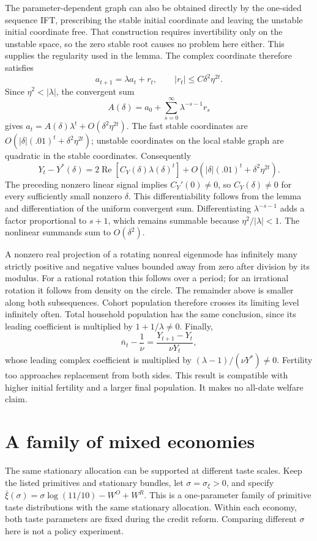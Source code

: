 \documentclass[
  11pt,
]{article}
\begin{document}
The parameter-dependent graph can also be obtained directly by the
one-sided sequence IFT, prescribing the stable initial coordinate and
leaving the unstable initial coordinate free. That construction requires
invertibility only on the unstable space, so the zero stable root causes
no problem here either. This supplies the regularity used in the lemma.
The complex coordinate therefore satisfies \[
 a_{t+1}=\lambda a_t+r_t,\qquad
 |r_t|\le C\delta^2\eta^{2t}.
\] Since \(\eta^2<|\lambda|\), the convergent sum \[
 A(\delta)=a_0+\sum_{s=0}^\infty\lambda^{-s-1}r_s
\] gives \(a_t=A(\delta)\lambda^t+O(\delta^2\eta^{2t})\). The fast
stable coordinates are \(O(|\delta|(.01)^t+\delta^2\eta^{2t})\);
unstable coordinates on the local stable graph are quadratic in the
stable coordinates. Consequently \[
 Y_t-Y^*(\delta)=2\operatorname{Re}
       [C_Y(\delta)\lambda(\delta)^t]
       +O(|\delta|(.01)^t+\delta^2\eta^{2t}).
\] The preceding nonzero linear signal implies \(C_Y'(0)\ne0\), so
\(C_Y(\delta)\ne0\) for every sufficiently small nonzero \(\delta\).
This differentiability follows from the lemma and differentiation of the
uniform convergent sum. Differentiating \(\lambda^{-s-1}\) adds a factor
proportional to \(s+1\), which remains summable because
\(\eta^2/|\lambda|<1\). The nonlinear summands sum to \(O(\delta^2)\).

A nonzero real projection of a rotating nonreal eigenmode has infinitely
many strictly positive and negative values bounded away from zero after
division by its modulus. For a rational rotation this follows over a
period; for an irrational rotation it follows from density on the
circle. The remainder above is smaller along both subsequences. Cohort
population therefore crosses its limiting level infinitely often. Total
household population has the same conclusion, since its leading
coefficient is multiplied by \(1+1/\lambda\ne0\). Finally, \[
 \bar n_t-\frac1\nu=
 \frac{Y_{t+1}-Y_t}{\nu Y_t},
\] whose leading complex coefficient is multiplied by
\((\lambda-1)/(\nu Y^*)\ne0\). Fertility too approaches replacement from
both sides. This result is compatible with higher initial fertility and
a larger final population. It makes no all-date welfare claim.

\section{A family of mixed economies}\label{a-family-of-mixed-economies}

The same stationary allocation can be supported at different taste
scales. Keep the listed primitives and stationary bundles, let
\(\sigma=\sigma_\xi>0\), and specify
\(\bar\xi(\sigma)=\sigma\log(11/10)-W^O+W^R\). This is a one-parameter
family of primitive taste distributions with the same stationary
allocation. Within each economy, both taste parameters are fixed during
the credit reform. Comparing different \(\sigma\) here is not a policy
experiment.
\end{document}
